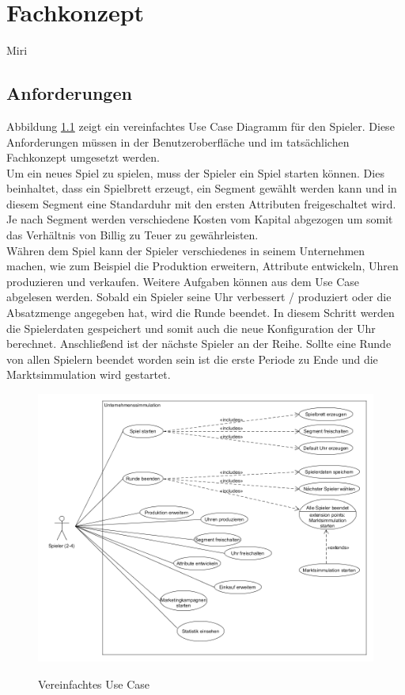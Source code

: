 \chapter{Fachkonzept}

Miri

\section{Anforderungen}

Abbildung \ref{fig:usecase} zeigt ein vereinfachtes Use Case Diagramm für den Spieler. Diese Anforderungen müssen in der Benutzeroberfläche und im tatsächlichen Fachkonzept umgesetzt werden. \\
Um ein neues Spiel zu spielen, muss der Spieler ein Spiel starten können. Dies beinhaltet, dass ein Spielbrett erzeugt, ein Segment gewählt werden kann und in diesem Segment eine Standarduhr mit den ersten Attributen freigeschaltet wird. Je nach Segment werden verschiedene Kosten vom Kapital abgezogen um somit das Verhältnis von Billig zu Teuer zu gewährleisten. \\
Währen dem Spiel kann der Spieler verschiedenes in seinem Unternehmen machen, wie zum Beispiel die Produktion erweitern, Attribute entwickeln, Uhren produzieren und verkaufen. Weitere Aufgaben können aus dem Use Case abgelesen werden. Sobald ein Spieler seine Uhr verbessert / produziert oder die Absatzmenge angegeben hat, wird die Runde beendet. In diesem Schritt werden die Spielerdaten gespeichert und somit auch die neue Konfiguration der Uhr berechnet. Anschließend ist der nächste Spieler an der Reihe. Sollte eine Runde von allen Spielern beendet worden sein ist die erste Periode zu Ende und die Marktsimmulation wird gestartet.

\begin{figure}[!h]
	\centering
	\includegraphics[scale=0.4]{img/UseCase.png} 
	\label{fig:usecase}
	\caption{Vereinfachtes Use Case}
\end{figure}

